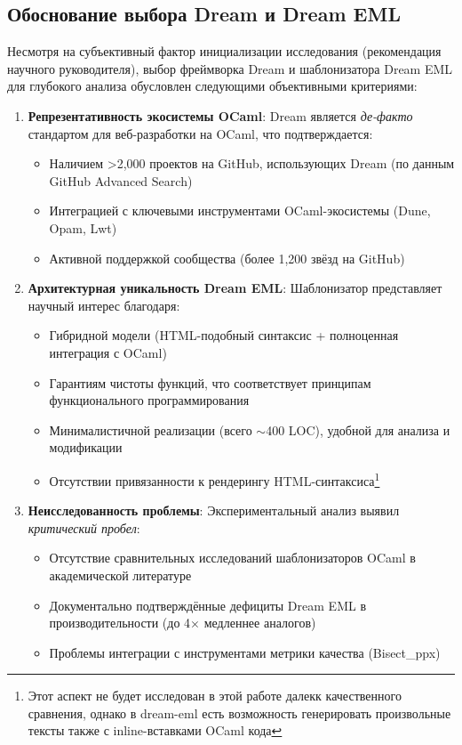 \subsection*{Обоснование выбора Dream и Dream EML}
Несмотря на субъективный фактор инициализации исследования (рекомендация научного руководителя), выбор фреймворка Dream и шаблонизатора Dream EML для глубокого анализа обусловлен следующими объективными критериями:
\begin{enumerate}
    \item \textbf{Репрезентативность экосистемы OCaml}:
          Dream является \textit{де-факто} стандартом для веб-разработки на OCaml, что подтверждается:
          \begin{itemize}
              \item Наличием >2,000 проектов на GitHub, использующих Dream (по данным GitHub Advanced Search)
              \item Интеграцией с ключевыми инструментами OCaml-экосистемы (Dune, Opam, Lwt)
              \item Активной поддержкой сообщества (более 1,200 звёзд на GitHub)
          \end{itemize}

    \item \textbf{Архитектурная уникальность Dream EML}:
          Шаблонизатор представляет научный интерес благодаря:
          \begin{itemize}
              \item Гибридной модели (HTML-подобный синтаксис + полноценная интеграция с OCaml)
              \item Гарантиям чистоты функций, что соответствует принципам функционального программирования
              \item Минималистичной реализации (всего $\sim$400 LOC), удобной для анализа и модификации
              \item Отсутствии привязанности к рендерингу HTML-синтаксиса\footnote{Этот аспект не будет исследован в этой работе далекк качественного сравнения, однако в dream-eml есть возможность генерировать произвольные тексты также с inline-вставками OCaml кода}
          \end{itemize}

    \item \textbf{Неисследованность проблемы}:
          Экспериментальный анализ выявил \textit{критический пробел}:
          \begin{itemize}
              \item Отсутствие сравнительных исследований шаблонизаторов OCaml в академической литературе
              \item Документально подтверждённые дефициты Dream EML в производительности (до 4$\times$ медленнее аналогов)
              \item Проблемы интеграции с инструментами метрики качества (Bisect\_ppx)
          \end{itemize}


\end{enumerate}
